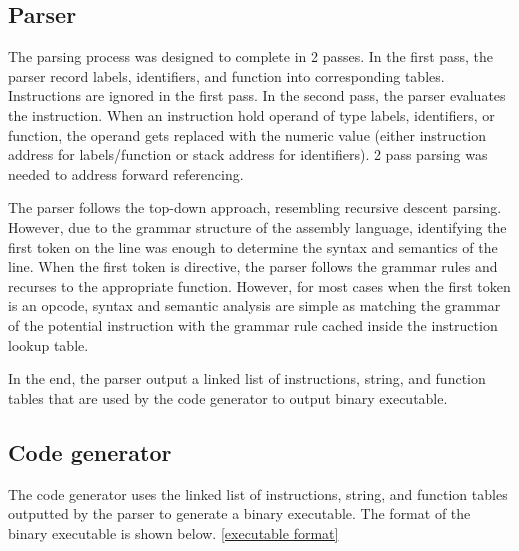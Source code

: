 \documentclass[manuscript,screen,nonacm]{acmart}
\begin{document}
\subsection{Parser}
The parsing process was designed to complete in 2 passes. In the first pass, the parser record labels, identifiers, and function into corresponding tables. Instructions are ignored in the first pass. In the second pass, the parser evaluates the instruction. When an instruction hold operand of type labels, identifiers, or function, the operand gets replaced with the numeric value (either instruction address for labels/function or stack address for identifiers). 2 pass parsing was needed to address forward referencing.

The parser follows the top-down approach, resembling recursive descent parsing. However, due to the grammar structure of the assembly language, identifying the first token on the line was enough to determine the syntax and semantics of the line. When the first token is directive, the parser follows the grammar rules and recurses to the appropriate function. However, for most cases when the first token is an opcode, syntax and semantic analysis are simple as matching the grammar of the potential instruction with the grammar rule cached inside the instruction lookup table.

In the end, the parser output a linked list of instructions, string, and function tables that are used by the code generator to output binary executable.

\subsection{Code generator}
The code generator uses the linked list of instructions, string, and function tables outputted by the parser to generate a binary executable. The format of the binary executable is shown below. \autoref{executable format}
\end{document}
